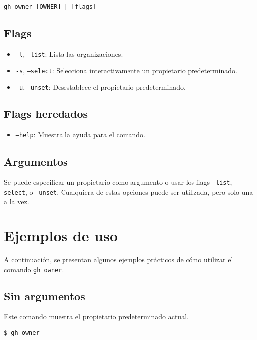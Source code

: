 \begin{verbatim}
gh owner [OWNER] | [flags]
\end{verbatim}

\subsection{Flags}

\begin{itemize}
    \item \texttt{-l}, \texttt{--list}: Lista las organizaciones.
    \item \texttt{-s}, \texttt{--select}: Selecciona interactivamente un propietario predeterminado.
    \item \texttt{-u}, \texttt{--unset}: Desestablece el propietario predeterminado.
\end{itemize}

\subsection{Flags heredados}

\begin{itemize}
    \item \texttt{--help}: Muestra la ayuda para el comando.
\end{itemize}

\subsection{Argumentos}

Se puede especificar un propietario como argumento o usar los flags \texttt{--list}, \texttt{--select}, o \texttt{--unset}. Cualquiera de estas opciones puede ser utilizada, pero solo una a la vez.

\section{Ejemplos de uso}

A continuación, se presentan algunos ejemplos prácticos de cómo utilizar el comando \texttt{gh owner}.

\subsection{Sin argumentos}

Este comando muestra el propietario predeterminado actual.

\begin{verbatim}
$ gh owner
\end{verbatim}

